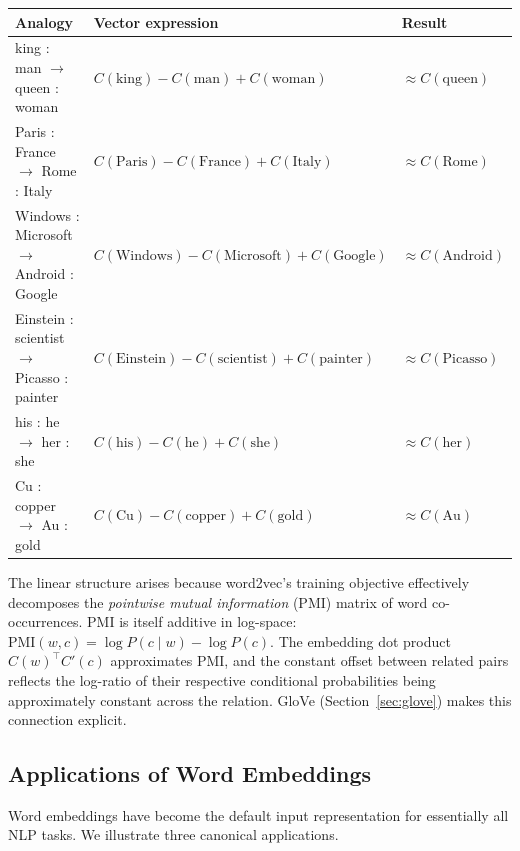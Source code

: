 \documentclass[11pt,a4paper]{article}
\begin{document}
\begin{center}
\renewcommand{\arraystretch}{1.3}
\begin{tabular}{lll}
\toprule
\textbf{Analogy} & \textbf{Vector expression} & \textbf{Result} \\
\midrule
king : man $\to$ queen : woman & $C(\text{king}) - C(\text{man}) + C(\text{woman})$ & $\approx C(\text{queen})$ \\
Paris : France $\to$ Rome : Italy & $C(\text{Paris}) - C(\text{France}) + C(\text{Italy})$ & $\approx C(\text{Rome})$ \\
Windows : Microsoft $\to$ Android : Google & $C(\text{Windows}) - C(\text{Microsoft}) + C(\text{Google})$ & $\approx C(\text{Android})$ \\
Einstein : scientist $\to$ Picasso : painter & $C(\text{Einstein}) - C(\text{scientist}) + C(\text{painter})$ & $\approx C(\text{Picasso})$ \\
his : he $\to$ her : she & $C(\text{his}) - C(\text{he}) + C(\text{she})$ & $\approx C(\text{her})$ \\
Cu : copper $\to$ Au : gold & $C(\text{Cu}) - C(\text{copper}) + C(\text{gold})$ & $\approx C(\text{Au})$ \\
\bottomrule
\end{tabular}
\end{center}

\begin{insightbox}
The linear structure arises because word2vec's training objective effectively decomposes the \emph{pointwise mutual information} (PMI) matrix of word co-occurrences. PMI is itself additive in log-space: $\text{PMI}(w, c) = \log P(c \mid w) - \log P(c)$. The embedding dot product $C(w)^\top C'(c)$ approximates PMI, and the constant offset between related pairs reflects the log-ratio of their respective conditional probabilities being approximately constant across the relation. GloVe (Section~\ref{sec:glove}) makes this connection explicit.
\end{insightbox}

\subsection{Applications of Word Embeddings}
\label{sec:we_applications}

Word embeddings have become the default input representation for essentially all NLP tasks. We illustrate three canonical applications.
\end{document}
